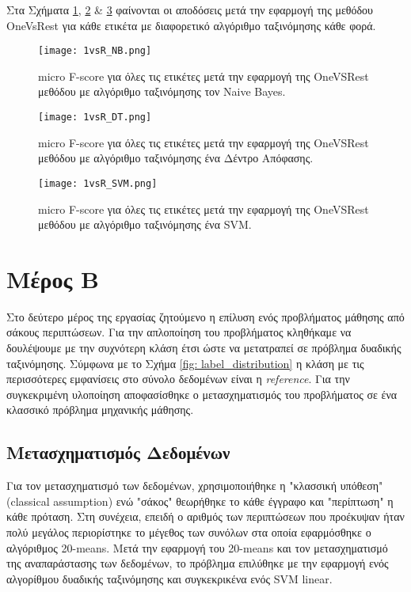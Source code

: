 Στα Σχήματα \ref{fig: 1vsR_NB}, \ref{fig: 1vsR_DT} \& \ref{fig: 1vsR_SVM} φαίνονται οι αποδόσεις μετά την εφαρμογή της μεθόδου OneVsRest για κάθε ετικέτα με διαφορετικό αλγόριθμο ταξινόμησης κάθε φορά.


\begin{figure}
	\texttt{[image: 1vsR\_NB.png]}
	\caption{micro F-score  για όλες τις ετικέτες μετά την εφαρμογή της OneVSRest μεθόδου με αλγόριθμο ταξινόμησης τον Naive Bayes.}
	\label{fig: 1vsR_NB}
\end{figure}


\begin{figure}
	\texttt{[image: 1vsR\_DT.png]}
	\caption{micro F-score  για όλες τις ετικέτες μετά την εφαρμογή της OneVSRest μεθόδου με αλγόριθμο ταξινόμησης ένα Δέντρο Απόφασης.}
	\label{fig: 1vsR_DT}
\end{figure}


\begin{figure}
	\texttt{[image: 1vsR\_SVM.png]}
	\caption{micro F-score  για όλες τις ετικέτες μετά την εφαρμογή της OneVSRest μεθόδου με αλγόριθμο ταξινόμησης ένα SVM.}
	\label{fig: 1vsR_SVM}
\end{figure}
\newpage
\section{Μέρος Β}

Στο δεύτερο μέρος της εργασίας ζητούμενο η επίλυση ενός προβλήματος μάθησης από σάκους περιπτώσεων. Για την απλοποίηση του προβλήματος κληθήκαμε να δουλέψουμε με την συχνότερη κλάση έτσι ώστε να μετατραπεί σε πρόβλημα δυαδικής ταξινόμησης. Σύμφωνα με το Σχήμα \ref{fig: label_distribution} η κλάση με τις περισσότερες εμφανίσεις στο σύνολο δεδομένων είναι η \emph{reference}. Για την συγκεκριμένη υλοποίηση αποφασίσθηκε ο μετασχηματισμός του προβλήματος σε ένα κλασσικό πρόβλημα μηχανικής μάθησης. 


\subsection{Μετασχηματισμός Δεδομένων}

Για τον μετασχηματισμό των δεδομένων, χρησιμοποιήθηκε η "κλασσική υπόθεση" (classical assumption) ενώ "σάκος" θεωρήθηκε το κάθε έγγραφο και "περίπτωση" η κάθε πρόταση.
Στη συνέχεια, επειδή ο αριθμός των περιπτώσεων που προέκυψαν ήταν πολύ μεγάλος περιορίστηκε το μέγεθος των συνόλων στα οποία εφαρμόσθηκε ο αλγόριθμος 20-means. Μετά την εφαρμογή του 20-means και τον μετασχηματισμό της αναπαράστασης των δεδομένων, το πρόβλημα 
επιλύθηκε με την εφαρμογή ενός αλγορίθμου δυαδικής ταξινόμησης και συγκεκρικένα ενός SVM linear.

